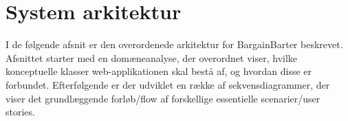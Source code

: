 \chapter{System arkitektur}\label{ch:Systemarkitektur}
I de følgende afsnit er den overordenede arkitektur for BargainBarter beskrevet. Afsnittet starter med en domæneanalyse, der overordnet viser, hvilke konceptuelle klasser web-applikationen skal bestå af, og hvordan disse er forbundet. Efterfølgende er der udviklet en række af sekvensdiagrammer, der viser det grundlæggende forløb/flow af forskellige essentielle scenarier/user stories.


